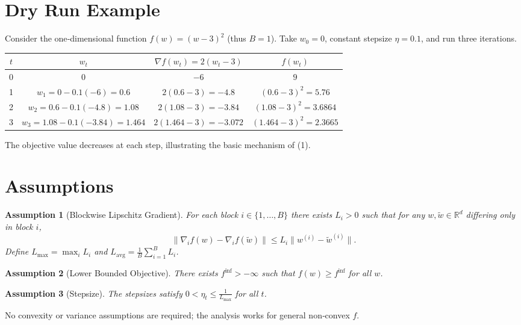 \documentclass{article}
\newtheorem{assumption}{Assumption}
\begin{document}
\section*{Dry Run Example}
Consider the one‑dimensional function $f(w)=(w-3)^2$ (thus $B=1$).  
Take $w_0=0$, constant stepsize $\eta=0.1$, and run three iterations.

\begin{center}
\begin{tabular}{c|c|c|c}
$t$ & $w_t$ & $\nabla f(w_t)=2(w_t-3)$ & $f(w_t)$\\ \hline
0 & $0$ & $-6$ & $9$\\
1 & $w_1=0-0.1(-6)=0.6$ & $2(0.6-3)=-4.8$ & $(0.6-3)^2=5.76$\\
2 & $w_2=0.6-0.1(-4.8)=1.08$ & $2(1.08-3)=-3.84$ & $(1.08-3)^2=3.6864$\\
3 & $w_3=1.08-0.1(-3.84)=1.464$ & $2(1.464-3)=-3.072$ & $(1.464-3)^2=2.3665$\\
\end{tabular}
\end{center}
The objective value decreases at each step, illustrating the basic
mechanism of (1).

\newpage

\section*{Assumptions}
\begin{assumption}[Blockwise Lipschitz Gradient]\label{ass:Lip}
For each block $i\in\{1,\dots ,B\}$ there exists $L_i>0$ such that for any
$w,\tilde w\in\mathbb{R}^{d}$ differing only in block $i$,
\[
\big\|\nabla_i f(w)-\nabla_i f(\tilde w)\big\|
\le L_i\big\|w^{(i)}-\tilde w^{(i)}\big\|.
\]
Define $L_{\max}= \max_i L_i$ and $L_{\mathrm{avg}}= \frac1B\sum_{i=1}^{B}L_i$.
\end{assumption}

\begin{assumption}[Lower Bounded Objective]\label{ass:bound}
There exists $f^{\inf}>-\infty$ such that $f(w)\ge f^{\inf}$ for all $w$.
\end{assumption}

\begin{assumption}[Stepsize]\label{ass:stepsize}
The stepsizes satisfy $0<\eta_t\le \frac{1}{L_{\max}}$ for all $t$.
\end{assumption}

No convexity or variance assumptions are required; the analysis works for
general non‑convex $f$.
\end{document}
